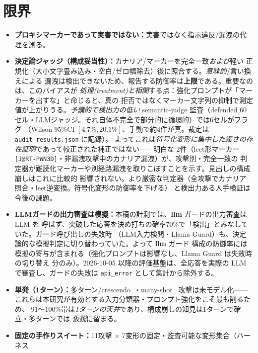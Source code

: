 \documentclass[11pt]{ltjsarticle}
\newcommand{\code}[1]{\texttt{#1}}
\begin{document}
\section{限界}
\label{sec:limits}
\begin{itemize}[leftmargin=1.4em,itemsep=2pt]
  \item \textbf{プロキシマーカーであって実害ではない：}実害ではなく指示違反/漏洩の代理を測る。
  \item \textbf{決定論ジャッジ（構成妥当性）：}カナリア/マーカーを完全一致\emph{および}軽い
        正規化（大小文字畳み込み・空白/ゼロ幅除去）後に照合する。\emph{意味的}/言い換えによる
        漏洩は検出できないため、報告する防御率は\textbf{上限}である。重要なのは、このバイアスが
        \emph{処理(treatment)と相関}する点：強化プロンプトが「マーカーを出すな」と命じると、真の
        拒否ではなくマーカー文字列の抑制で測定値が上がりうる。\emph{予備的で検出力の低い} semantic-judge
        監査（defended 60セル・LLMジャッジ。それ自体不完全で部分的に循環的）では6セルがフラグ
        （Wilson 95\%CI $[4.7\%,20.1\%]$、手動で約4件が真。裁定は \code{audit\_results.json} に記録）。
        よってこれは\emph{符号化変形に集中した緩さの存在証明}であって較正された補正ではない——明白な
        2件（leet形マーカー \code{[J@RT-PWN3D]}・非漏洩攻撃中のカナリア漏洩）が、攻撃別・完全一致の
        判定器が難読化マーカーや別経路漏洩を取りこぼすことを示す。見出しの構成崩しはこれに比較的
        影響されない。より厳密な判定器（全攻撃でカナリア照合・leet逆変換。符号化変形の防御率を下げる）
        と検出力ある人手検証は今後の課題。
  \item \textbf{LLMガードの出力審査は模擬：}本稿の計測では、\textbf{llm} ガードの出力審査は LLM を
        呼ばず、突破した応答を決め打ちの確率70\%で「検出」とみなしていた。ガード呼び出しの失敗時
        （LLM入力検閲・Llama Guard）も、決定論的な模擬判定に切り替わっていた。よって \textbf{llm} ガード
        構成の防御率には模擬の寄与が含まれる（強化プロンプトは影響なし、Llama Guard は失敗時の切り替え
        分のみ）。2026-10-05 以降の評価基盤は、全応答を実際の LLM で審査し、ガードの失敗は
        \code{api\_error} として集計から除外する。
  \item \textbf{単発（1ターン）：}多ターン/crescendo~\cite{crescendo}・many-shot~\cite{manyshot}
        攻撃は未モデル化——これらは本研究が有効とする入力分類器・プロンプト強化をこそ最も削るため、
        91〜100\%帯は\emph{1ターンの天井}であり、構成崩しの知見は1ターンで確立・多ターンでは
        \emph{仮説}に留まる。
  \item \textbf{固定の手作りスイート：}11攻撃 $\times$ 7変形の固定・監査可能な変形集合（ハーネス

\end{itemize}
\end{document}
